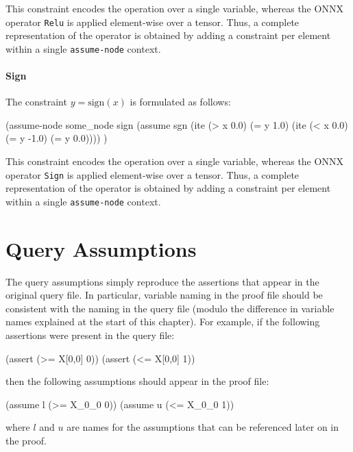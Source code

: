 \noindent This constraint encodes the operation over a single variable, whereas the ONNX operator \texttt{Relu} is applied element-wise over a tensor. 
Thus, a complete representation of the operator is obtained by adding a constraint per element within a single \texttt{assume-node} context.

\paragraph{Sign}
The constraint $y = \mathrm{sign}(x)$ is formulated as
follows: 

\begin{code}[style=lbnf]
(assume-node some_node sign
    (assume sgn (ite (> x 0.0)
                     (= y 1.0)
                     (ite (< x 0.0)
                          (= y -1.0)
                          (= y 0.0))))
)
\end{code}


\noindent This constraint encodes the operation over a single variable, whereas the ONNX operator \texttt{Sign} is applied element-wise over a tensor. 
Thus, a complete representation of the operator is obtained by adding a constraint per element within a single \texttt{assume-node} context.

\section{Query Assumptions}

The query assumptions simply reproduce the assertions that appear in the original \vnnlib{} query file. In particular, variable naming in the proof file should be consistent with the naming in the query file (modulo the difference in variable names explained at the start of this chapter).
For example, if the following assertions were present in the query file:

\begin{code}[style=lbnf]
	(assert (>= X[0,0] 0))
	(assert (<= X[0,0] 1))
\end{code}

\noindent then the following assumptions should appear in the proof file:

\begin{code}[style=lbnf]
	(assume l (>= X_0_0 0))
	(assume u (<= X_0_0 1))
\end{code}

\noindent where $l$ and $u$ are names for the assumptions that can be referenced later on in the proof.

